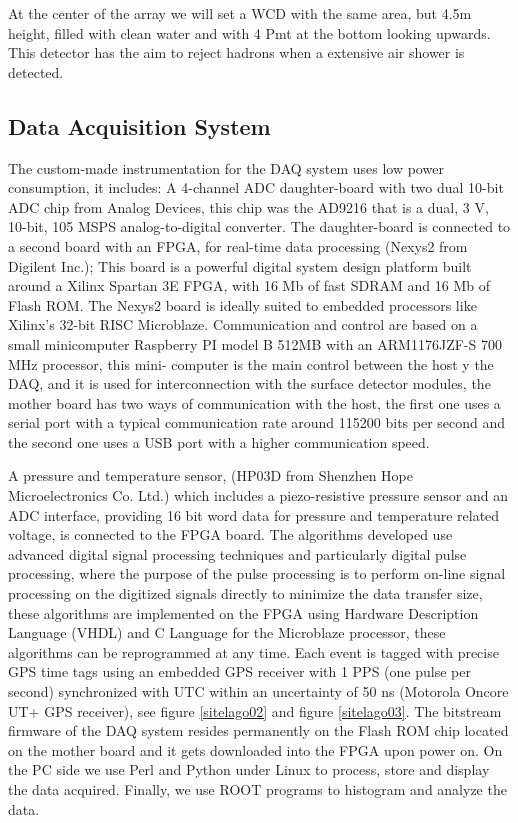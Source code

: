 \documentclass[a4paper]{article}
\begin{document}
At the center of the array we will set a WCD with the same area, but  4.5m height, 
filled with clean water and with 4 Pmt at the bottom looking upwards. This detector
has the aim to reject hadrons  when  a extensive air shower is detected.

\subsection{Data Acquisition System}
The custom-made instrumentation for the DAQ system uses low power consumption,
it includes: A 4-channel ADC daughter-board with two dual 10-bit ADC chip
from Analog Devices, this chip was the AD9216 that is a dual, 3 V, 10-bit,
105 MSPS analog-to-digital converter. The daughter-board is connected to a
second board with an FPGA, for real-time data processing (Nexys2 from Digilent
Inc.); This board is a powerful digital system design platform built around a
Xilinx Spartan 3E FPGA, with 16 Mb of fast SDRAM and 16 Mb of Flash ROM. The
Nexys2 board is ideally suited to embedded processors like Xilinx's 32-bit
RISC Microblaze. Communication and control are based on a small minicomputer
Raspberry PI model B 512MB with an ARM1176JZF-S 700 MHz processor, this mini-
computer is the main control between the host y the DAQ, and it is used for
interconnection with the surface detector modules, the mother board has two
ways of communication with the host, the first one uses a serial port with a
typical communication rate around 115200 bits per second and the second one
uses a USB port with a higher communication speed.

A pressure and temperature sensor, (HP03D from Shenzhen Hope Microelectronics
Co. Ltd.) which includes a piezo-resistive pressure sensor and an ADC interface,
providing 16 bit word data for pressure and temperature related voltage, is
connected to the FPGA board. The algorithms developed use advanced digital
signal processing techniques and particularly digital pulse processing, where
the purpose of the pulse processing is to perform on-line signal processing
on the digitized signals directly to minimize the data transfer size, these
algorithms are implemented on the FPGA using Hardware Description Language
(VHDL) and C Language for the Microblaze processor, these algorithms can be
reprogrammed at any time. Each event is tagged with precise GPS time tags using
an embedded GPS receiver with 1 PPS (one pulse per second) synchronized with
UTC within an uncertainty of 50 ns (Motorola Oncore UT+ GPS receiver), see figure \ref{sitelago02}
and figure \ref{sitelago03}. The bitstream firmware of the DAQ system resides permanently on the
Flash ROM chip located on the mother board and it gets downloaded into the FPGA
upon power on. On the PC side we use Perl and Python under Linux to process,
store and display the data acquired. Finally, we use ROOT programs to histogram
and analyze the data.
\end{document}
